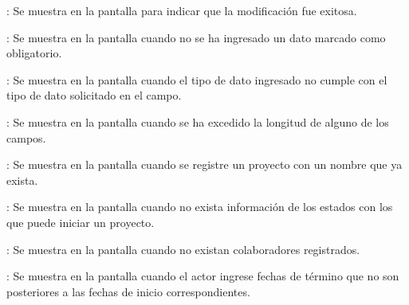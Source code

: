 \begin{Citemize}
	\item {}: Se muestra en la pantalla  para indicar que la modificación fue exitosa.
	\item {}: Se muestra en la pantalla  cuando no se ha ingresado un dato marcado como obligatorio.
	\item {}: Se muestra en la pantalla  cuando el tipo de dato ingresado no cumple con el tipo de dato solicitado en el campo.
	\item {}: Se muestra en la pantalla  cuando se ha excedido la longitud de alguno de los campos.
	\item {}: Se muestra en la pantalla  cuando se registre un proyecto con un nombre que ya exista.
	\item {}: Se muestra en la pantalla  cuando no exista información de los estados con los que puede iniciar un proyecto.
	\item {}: Se muestra en la pantalla  cuando no existan
	colaboradores registrados.
	\item {}: Se muestra en la pantalla  cuando el actor ingrese fechas de término que no son posteriores a las fechas de inicio correspondientes.
\end{Citemize}
